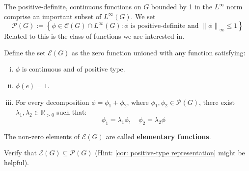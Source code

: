 \documentclass[11pt, x11names]{book}
\newcommand{\rr}{\mathbb{R}}
\newcommand{\fanc}{\mathscr{C}}
\newcommand{\fane}{\mathscr{E}}
\newcommand{\fanp}{\mathscr{P}}
\newcommand{\set}[1]{\left\{ #1 \right\}}
\newcommand{\norm}[1]{\left\lVert #1 \right \rVert}
\begin{document}
The positive-definite, continuous functions on $G$ bounded by 1 in the $L^\infty$ norm comprise an important subset of $L^\infty(G)$. We set 
\begin{equation*}
    \fanp(G) := \set{\phi \in \fanc(G) \cap L^\infty(G) : \phi \text{ is positive-definite and } \norm{\phi}_\infty \leq 1}
\end{equation*}
Related to this is the class of functions we are interested in.
\begin{defn}
    Define the set $\fane(G)$ as the zero function unioned with any function satisfying:
    \begin{enumerate}[(i)]
        \item $\phi$ is continuous and of positive type.
        \item $\phi(e) = 1$.
        \item For every decomposition $\phi = \phi_1 + \phi_2$, where $\phi_1,\phi_2 \in \fanp(G)$, there exist $\lambda_1, \lambda_2 \in \rr_{> 0}$ such that:
        \begin{equation*}
            \phi_1 = \lambda_1 \phi, \quad \phi_2 = \lambda_2 \phi
        \end{equation*}
    \end{enumerate}
    The non-zero elements of $\fane(G)$ are called \textbf{elementary functions}.
\end{defn}

\begin{sanitycheck}
    Verify that $\fane(G) \subseteq \fanp(G)$ (Hint: \ref{cor: positive-type representation} might be helpful).
\end{sanitycheck}
\end{document}
